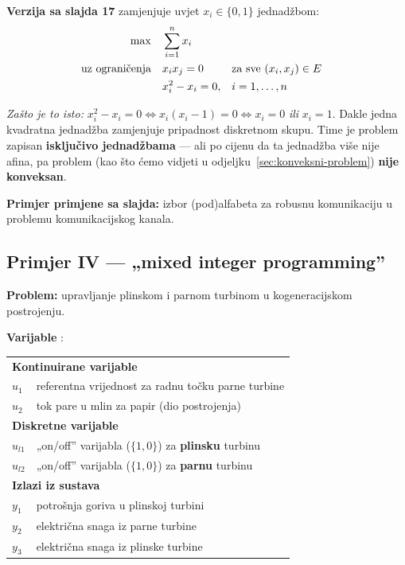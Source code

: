 \textbf{Verzija sa slajda 17} zamjenjuje uvjet $x_i \in \{0,1\}$ jednadžbom:
\begin{equation}
\begin{aligned}
\max \quad & \sum_{i=1}^{n} x_i \\
\uzogr & x_ix_j = 0 && \text{za sve } (x_i, x_j) \in E \\
& x_i^2 - x_i = 0, && i = 1,\dots,n
\end{aligned}
\end{equation}

\emph{Zašto je to isto:} $x_i^2 - x_i = 0 \Leftrightarrow x_i(x_i - 1) = 0
\Leftrightarrow x_i = 0$ \emph{ili} $x_i = 1$. Dakle jedna kvadratna jednadžba
zamjenjuje pripadnost diskretnom skupu. Time je problem zapisan
\textbf{isključivo jednadžbama} --- ali po cijenu da ta jednadžba više nije
afina, pa problem (kao što ćemo vidjeti u odjeljku~\ref{sec:konveksni-problem})
\textbf{nije konveksan}.

\textbf{Primjer primjene sa slajda:} izbor (pod)alfabeta za robusnu komunikaciju
u problemu komunikacijskog kanala.

\subsection{Primjer IV --- „mixed integer programming”}

\textbf{Problem:} upravljanje plinskom i parnom turbinom u kogeneracijskom
postrojenju.

\textbf{Varijable} :

\begin{center}
\begin{tabular}{ll}
\toprule
\multicolumn{2}{l}{\textbf{Kontinuirane varijable}} \\
$u_1$ & referentna vrijednost za radnu točku parne turbine \\
$u_2$ & tok pare u mlin za papir (dio postrojenja) \\
\midrule
\multicolumn{2}{l}{\textbf{Diskretne varijable}} \\
$u_{l1}$ & „on/off” varijabla ($\{1,0\}$) za \textbf{plinsku} turbinu \\
$u_{l2}$ & „on/off” varijabla ($\{1,0\}$) za \textbf{parnu} turbinu \\
\midrule
\multicolumn{2}{l}{\textbf{Izlazi iz sustava}} \\
$y_1$ & potrošnja goriva u plinskoj turbini \\
$y_2$ & električna snaga iz parne turbine \\
$y_3$ & električna snaga iz plinske turbine \\
\bottomrule
\end{tabular}
\end{center}


